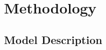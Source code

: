 \documentclass[draft]{agujournal2019}
\begin{document}



\section{Methodology}\label{methods}


\subsection{Model Description}
\label{sec:model}
\end{document}

